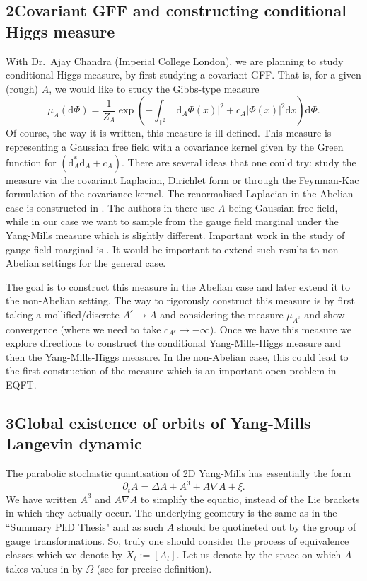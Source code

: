 \documentclass[12pt]{article}
\numberwithin{equation}{section}
\theoremstyle{definition}
\theoremstyle{remark}
\newcommand{\diff}{\mathrm{d}}
\newcommand{\1}{\mathbf 1}
\newcommand{\<}{\langle}
\renewcommand{\>}{\rangle}
\newcommand{\bT}{\mathbb T}
\begin{document}
\subsection*{2\quad Covariant GFF and constructing conditional Higgs measure}
With Dr.\ Ajay Chandra (Imperial College London), we are planning to study conditional Higgs measure, by first studying a covariant GFF. That is, for a given (rough) $A$, we would like to study the Gibbs-type measure
\[
\mu_A(\diff\Phi)=\frac 1 {Z_A} \exp\left( -\int_{\bT^2}|\diff_A\Phi(x)|^2+c_A|\Phi(x)|^2\diff x\right)\diff\Phi. 
\]
Of course, the way it is written, this measure is ill-defined. This measure is representing a Gaussian free field with a covariance kernel given by the Green function for $(\diff_A^*\diff_A+c_A)$. There are several ideas that one could try: study the measure via the covariant Laplacian, Dirichlet form or through the Feynman-Kac formulation of the covariance kernel. The renormalised Laplacian in the Abelian case is constructed in \cite{MM22}. The authors in there use $A$ being Gaussian free field, while in our case we want to sample from the gauge field marginal under the Yang-Mills measure which is slightly different. Important work in the study of gauge field marginal is \cite{CC24}. It would be important to extend such results to non-Abelian settings for the general case.   

The goal is to construct this measure in the Abelian case and later extend it to the non-Abelian setting. The way to rigorously construct this measure is by first taking a mollified/discrete $A^\varepsilon\to A$ and considering the measure $\mu_{A^\varepsilon}$ and show convergence (where we need to take $c_{A^\varepsilon}\to-\infty$). Once we have this measure we explore directions to construct the conditional Yang-Mills-Higgs measure and then the Yang-Mills-Higgs measure. In the non-Abelian case, this could lead to the first construction of the measure which is an important open problem in EQFT. 

\subsection*{3\quad Global existence of orbits of Yang-Mills Langevin dynamic}
The parabolic stochastic quantisation of 2D Yang-Mills  has essentially the form 
\[
\partial_t A=\Delta A + A^3+A\nabla A+\xi.
\]
We have written $A^3$ and $A\nabla A$  to simplify the equatio, instead of the Lie brackets in which they actually occur. The underlying geometry is the same as in the ``Summary PhD Thesis" and as such $A$ should be quotineted out by the group of gauge transformations. So, truly one should consider the process of equivalence classes which we denote by $X_t:=[A_t]$. Let us denote by the space on which $A$ takes values in by $\Omega$ (see \cite{CCHS2d} for precise definition). 
\end{document}
